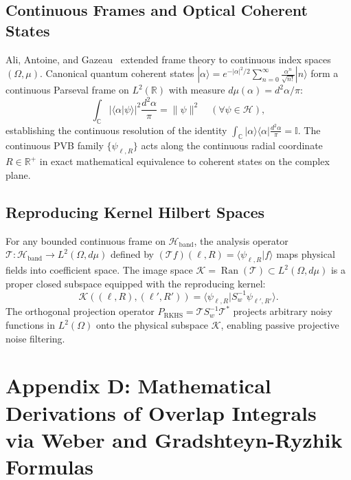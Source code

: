 \documentclass[11pt,a4paper]{article}
\begin{document}
\subsection{Continuous Frames and Optical Coherent States}

Ali, Antoine, and Gazeau~\cite{Ali1993,Gazeau2009,Klauder1985,Perelomov1986} extended frame theory to continuous index spaces $(\Omega, \mu)$. Canonical quantum coherent states $|\alpha\rangle = e^{-|\alpha|^2/2} \sum_{n=0}^\infty \frac{\alpha^n}{\sqrt{{n}!}} |n\rangle$ form a continuous Parseval frame on $L^2(\mathbb{R})$ with measure $d\mu(\alpha) = d^2\alpha / \pi$:
\begin{equation}
\int_\mathbb{C} |\langle \alpha | \psi \rangle|^2 \frac{d^2\alpha}{\pi} = \|\psi\|^2 \quad (\forall \psi \in \mathcal{H}),
\label{eq:app_coherent_parseval}
\end{equation}
establishing the continuous resolution of the identity $\int_\mathbb{C} |\alpha\rangle \langle \alpha| \frac{d^2\alpha}{\pi} = \mathbb{I}$. The continuous PVB family $\{\psi_{\ell, R}\}$ acts along the continuous radial coordinate $R \in \mathbb{R}^+$ in exact mathematical equivalence to coherent states on the complex plane.

\subsection{Reproducing Kernel Hilbert Spaces}

For any bounded continuous frame on $\mathcal{H}_{\text{band}}$, the analysis operator $\mathcal{T}: \mathcal{H}_{\text{band}} \to L^2(\Omega, d\mu)$ defined by $(\mathcal{T} f)(\ell, R) = \langle \psi_{\ell, R} | f \rangle$ maps physical fields into coefficient space. The image space $\mathcal{K} = \operatorname{Ran}(\mathcal{T}) \subset L^2(\Omega, d\mu)$ is a proper closed subspace equipped with the reproducing kernel:
\begin{equation}
\mathcal{K}((\ell, R), (\ell', R')) = \langle \psi_{\ell, R} | S_w^{-1} \psi_{\ell', R'} \rangle.
\label{eq:app_reproducing_kernel}
\end{equation}
The orthogonal projection operator $P_{\text{RKHS}} = \mathcal{T} S_w^{-1} \mathcal{T}^*$ projects arbitrary noisy functions in $L^2(\Omega)$ onto the physical subspace $\mathcal{K}$, enabling passive projective noise filtering.

\section{Appendix D: Mathematical Derivations of Overlap Integrals via Weber and Gradshteyn-Ryzhik Formulas}
\label{app:weber_proofs}
\end{document}
